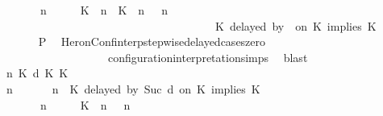 \begin{isabellebody}
\ \ \ \ \ \ \ {\isacartoucheopen}{\isacharparenleft}{\isasymGamma}\ n\ {\isasymturnstile}\ {\isasymPsi}\ {\isasymtriangleright}\ {\isasymPhi}\ {\isacharequal}\ {\isacharparenleft}{\isacharparenleft}{\isacharparenleft}K\ {\isasymUp}\ n{\isacharparenright}\ {\isacharhash}\ {\isacharparenleft}K\ {\isasymUp}\ n{\isacharparenright}\ {\isacharhash}\ {\isasymGamma}{\isacharparenright}{\isacharcomma}\ n\isanewline
\ \ \ \ \ \ \ \ \ \ \ \ \ \ \ \ \ \ \ \ \ \ \ \ \ \ \ \ \ \ \ \ \ \ \ \ {\isasymturnstile}\ {\isasymPsi}\ {\isasymtriangleright}\ {\isacharparenleft}{\isacharparenleft}K\ delayed\ by\ {}\ on\ K\ implies\ K\ {\isacharhash}\ {\isasymPhi}{\isacharparenright}{\isacharparenright}{\isacartoucheclose}\isanewline
\ \ \ \ \ \ \isamarkupfalse%
\ {\isacharquery}P\ \isamarkupfalse%
\ HeronConf{\isacharunderscore}interp{\isacharunderscore}stepwise{\isacharunderscore}delayed{\isacharunderscore}cases{\isacharunderscore}zero\isanewline
\ \ \ \ \ \ \ \ \ \ \ \ \ \ \ \ \ \ \ \ configuration{\isacharunderscore}interpretation{\isachardot}simps\ \isamarkupfalse%
\ blast\isanewline
\ \ \ \ \isamarkupfalse%
\isanewline
\ \ \ \ \ \ \isamarkupfalse%
\ {\isasymGamma}\ n\ K\ d\ K\ K\ {\isasymPsi}\ {\isasymPhi}\isanewline
\ \ \ \ \ \ \isamarkupfalse%
\ {\isacartoucheopen}{\isacharparenleft}{\isasymGamma}\ n\ {\isasymturnstile}\ {\isasymPsi}\ {\isasymtriangleright}\ {\isasymPhi}\ {\isacharequal}\ {\isacharparenleft}{\isasymGamma}{\isacharcomma}\ n\ {\isasymturnstile}\ {\isacharparenleft}K\ delayed\ by\ Suc\ d\ on\ K\ implies\ K\ {\isacharhash}\ {\isasymPsi}\ {\isasymtriangleright}\ {\isasymPhi}{\isacharparenright}{\isacartoucheclose}\isanewline
\ \ \ \ \ \ \ {\isacartoucheopen}{\isacharparenleft}{\isasymGamma}\ n\ {\isasymturnstile}\ {\isasymPsi}\ {\isasymtriangleright}\ {\isasymPhi}\ {\isacharequal}\ {\isacharparenleft}{\isacharparenleft}{\isacharparenleft}K\ {\isasymUp}\ n{\isacharparenright}\ {\isacharhash}\ {\isasymGamma}{\isacharparenright}{\isacharcomma}\ n\isanewline

\end{isabellebody}
